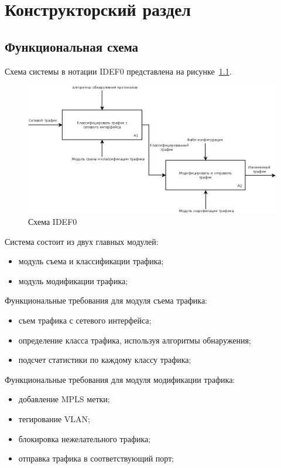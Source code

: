 \chapter{Конструкторский раздел}
\label{cha:design}
\section{Функциональная схема}
Схема системы в нотации IDEF0 представлена на рисунке~\ref{pic:idef0_schema}.
\begin{figure}
\centering
\includegraphics[scale=0.5]{pictures/idef0_schema}
\caption{Схема IDEF0}
\label{pic:idef0_schema}
\end{figure}

Система состоит из двух главных модулей:
\begin{itemize}
\item модуль съема и классификации трафика;
\item модуль модификации трафика;
\end{itemize}

Функциональные требования для модуля съема трафика:
\begin{itemize}
\item съем трафика с сетевого интерфейса;
\item определение класса трафика, используя алгоритмы обнаружения;
\item подсчет статистики по каждому классу трафика;
\end{itemize}

Функциональные требования для модуля модификации трафика:
\begin{itemize}
\item добавление MPLS метки;
\item тегирование VLAN;
\item блокировка нежелательного трафика;
\item отправка трафика в соответствующий порт;
\end{itemize}

